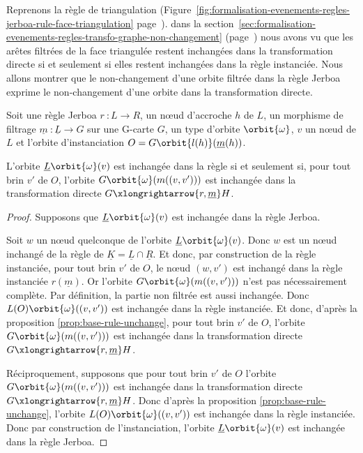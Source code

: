 Reprenons la règle de triangulation
(Figure~\ref{fig:formalisation-evenements-regles-jerboa-rule-face-triangulation}
page~\pageref{fig:formalisation-evenements-regles-jerboa-rule-face-triangulation}). %
dans la
section~\ref{sec:formalisation-evenements-regles-transfo-graphe-non-changement} (page~\pageref{sec:formalisation-evenements-regles-transfo-graphe-non-changement}) nous avons vu que les arêtes filtrées de la face triangulée restent inchangées dans la transformation directe si et seulement si elles restent inchangées dans la règle instanciée. %
Nous allons montrer que le non-changement d'une orbite filtrée dans la règle
Jerboa exprime le non-changement d'une orbite dans la transformation directe. %

\begin{proposition}
	Soit une règle Jerboa $r~: L \longrightarrow R$, un nœud d'accroche $h$ de $L$,
	un morphisme de filtrage $\underline{m}~: \underline{L} \rightarrow G$ sur une G-carte
	$G$, un type d'orbite $\orbit{\omega}$, $v$ un nœud de $L$ et l'orbite d'instanciation $O = G\orbit{l(h)}(\underline{m}(h))$.

	L'orbite $\underline{L}\orbit{\omega}(v)$ est inchangée dans
	la règle si et seulement si, pour tout brin $v'$ de $O$, l'orbite $G\orbit{\omega}(m((v,v')))$ est
	inchangée dans la transformation directe $G \xlongrightarrow{r,\underline{m}} H$.
\end{proposition}

\begin{proof}
	Supposons que $\underline{L}\orbit{\omega}(v)$ est inchangée dans la règle Jerboa.

	Soit $w$ un nœud quelconque de l'orbite $\underline{L}\orbit{\omega}(v)$. %
	Donc $w$ est un	nœud inchangé de la règle de $\underline{K} = \underline{L} \cap \underline{R}$. Et donc, par construction de la règle
	instanciée, pour tout brin $v'$ de $O$, le n\oe ud $(w,v')$ est inchangé dans la règle instanciée	$r(\underline{m})$. %
	Or l'orbite $G\orbit{\omega}(m((v,v')))$ n'est pas
	nécessairement complète. %
	Par définition, la partie non filtrée est aussi inchangée. %
	Donc $L(O)\orbit{\omega}((v,v'))$ est inchangée dans la règle instanciée. %
	Et donc, d'après la proposition
	\ref{prop:base-rule-unchange}, pour tout brin $v'$ de $O$, l'orbite $G\orbit{\omega}(m((v,v')))$ est
	inchangée dans la transformation directe $G \xlongrightarrow{r,\underline{m}} H$.

	Réciproquement, supposons que pour tout brin $v'$ de $O$ l'orbite $G\orbit{\omega}(m((v,v')))$ est
	inchangée dans la transformation directe $G \xlongrightarrow{r, \underline{m}} H$. %
	Donc d'après la proposition	\ref{prop:base-rule-unchange}, l'orbite $L(O)\orbit{\omega}((v,v'))$  est inchangée
	dans la règle instanciée. %
	Donc par construction de l'instanciation, l'orbite $\underline{L}\orbit{\omega}(v)$ est inchangée dans la règle Jerboa. %
\end{proof}

